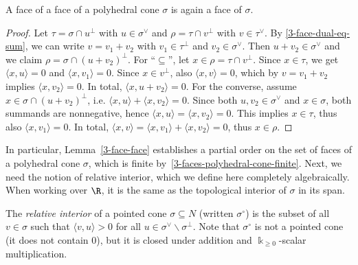 \begin{lemma}
  \label{3-face-face}
  A face of a face of a polyhedral cone \( \sigma \) is again a face
  of \( \sigma \).
\end{lemma}
\begin{proof}
  Let \( \tau = \sigma \cap u^{\perp} \) with \( u \in \sigma^{\vee}
  \) and \( \rho = \tau \cap v^{\perp} \) with \( v \in \tau^{\vee}
  \). By \ref{3-face-dual-eq-sum}, we can write \( v = v_1 + v_2 \)
  with \( v_1 \in \tau^{\perp} \) and \( v_2 \in \sigma^{\vee} \).
  Then \( u + v_2 \in \sigma^{\vee} \) and we claim \( \rho = \sigma
  \cap (u + v_2)^{\perp} \). For ``\( \subseteq \)'', let \( x \in
  \rho = \tau \cap v^{\perp} \). Since \( x \in \tau \), we get \(
  \langle x, u \rangle = 0 \) and \( \langle x, v_1 \rangle = 0 \).
  Since \( x \in v^{\perp} \), also \( \langle x, v \rangle = 0 \),
  which by \( v = v_1 + v_2 \) implies \( \langle x, v_2 \rangle = 0
  \). In total, \( \langle x, u + v_2 \rangle = 0 \). For the
  converse, assume \( x \in \sigma \cap (u + v_2)^{\perp} \), i.e. \(
  \langle x, u \rangle + \langle x, v_2 \rangle = 0 \). Since both \(
  u, v_2 \in \sigma^{\vee} \) and \( x \in \sigma \), both summands
  are nonnegative, hence \( \langle x, u \rangle = \langle x, v_2
  \rangle = 0 \). This implies \( x \in \tau \), thus also \( \langle
  x, v_1 \rangle = 0 \). In total, \( \langle x, v \rangle = \langle
  x, v_1 \rangle + \langle x, v_2 \rangle = 0 \), thus \( x \in \rho
  \).
\end{proof}

In particular, Lemma~\ref{3-face-face} establishes a partial order on
the set of faces of a polyhedral cone \( \sigma \), which is finite
by~\ref{3-faces-polyhedral-cone-finite}. Next, we need the notion of
relative interior, which we define here completely algebraically. When
working over \( \R \), it is the same as the topological interior of
\( \sigma \) in its span.

\begin{definition}
  \label{3-rel-interior}
  The \emph{relative interior} of a pointed cone \( \sigma \subseteq N
  \) (written \( \sigma^{\circ} \)) is the subset of all \( v \in
  \sigma \) such that \( \langle v, u \rangle > 0 \) for all \( u \in
  \sigma^{\vee} \backslash \sigma^{\perp} \). Note that \(
  \sigma^{\circ} \) is not a pointed cone (it does not contain \( 0
  \)), but it is closed under addition and \( \Bbbk_{\geq 0} \)-scalar
  multiplication.
\end{definition}

